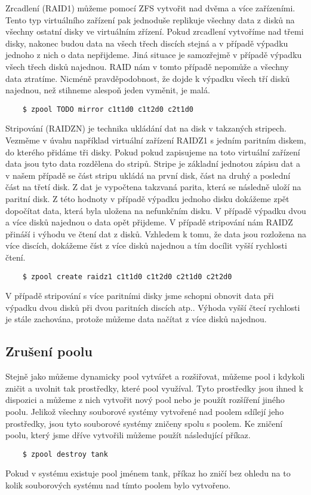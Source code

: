     Zrcadlení (RAID1) můžeme pomocí ZFS vytvořit nad dvěma a více zařízeními. Tento typ virtuálního zařízení pak jednoduše replikuje všechny data z disků na všechny ostatní disky
    ve virtuálním zřízení. Pokud zrcadlení vytvoříme nad třemi disky, nakonec budou data na všech třech discích stejná a v případě výpadku jednoho z nich o data nepřijdeme. Jiná situace je samozřejmě v případě výpadku všech třech disků najednou. RAID nám v tomto případě nepomůže a všechny data ztratíme. Nicméně pravděpodobnost, že dojde k výpadku všech
    tří disků najednou, než stihneme alespoň jeden vyměnit, je malá.
    \begin{verbatim}
    $ zpool TODO mirror c1t1d0 c1t2d0 c2t1d0
    \end{verbatim}

    Stripování (RAIDZN) je technika ukládání dat na disk v takzaných stripech. Vezměme v úvahu například virtuální zařízení RAIDZ1 s jedním paritním diskem, do kterého přidáme tři disky. Pokud pokud zapisujeme na toto virtuální zařízení data jsou tyto data rozdělena do stripů. Stripe je základní jednotou zápisu dat a v našem případě se část stripu ukládá na první disk, část na druhý a poslední část na třetí disk. Z dat je vypočtena takzvaná parita, která se následně uloží na paritní disk. Z této hodnoty v případě výpadku jednoho disku dokážeme zpět dopočítat data, která byla uložena na nefunkčním disku. V případě výpadku dvou a více disků najednou o data opět přijdeme. V případě stripování nám RAIDZ přináší i výhodu ve čtení dat z disků. Vzhledem k tomu, že data jsou rozložena na více discích, dokážeme číst z více disků najednou a tím docílit vyšší rychlosti čtení.
    \begin{verbatim}
    $ zpool create raidz1 c1t1d0 c1t2d0 c2t1d0 c2t2d0
    \end{verbatim}

    V případě stripování s více paritními disky jsme schopni obnovit data při výpadku dvou disků při dvou paritních discích atp.. Výhoda vyšší čtecí rychlosti je stále zachována, protože můžeme data načítat z více disků najednou.
    \subsection{Zrušení poolu}
    Stejně jako můžeme dynamicky pool vytvářet a rozšiřovat, můžeme pool i kdykoli zničit a uvolnit tak prostředky, které pool využíval. Tyto prostředky jsou ihned k dispozici a můžeme z nich vytvořit nový pool nebo je použít rozšíření jiného poolu. Jelikož všechny souborové systémy vytvořené nad poolem sdílejí jeho prostředky, jsou tyto souborové systémy zničeny spolu s poolem. Ke zničení poolu, který jsme dříve vytvořili můžeme použít následující příkaz.
    \begin{verbatim}
    $ zpool destroy tank
    \end{verbatim}
    Pokud v systému existuje pool jménem tank, příkaz ho zničí bez ohledu na to kolik souborových systému nad tímto poolem bylo vytvořeno.
        
